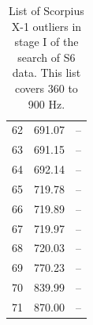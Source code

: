 \begin{table}
\begin{center}
\begin{tabular}{r r l}
62 & 691.07 & -- \\
63 & 691.15 & -- \\
64 & 692.14 & -- \\
65 & 719.78 & -- \\
66 & 719.89 & -- \\
67 & 719.97 & -- \\
68 & 720.03 & -- \\
69 & 770.23 & -- \\
70 & 839.99 & -- \\
71 & 870.00 & -- \\
\end{tabular}
\caption{List of Scorpius X-1 outliers in stage I of the search of S6 data. This list covers 360 to 900 Hz.}
\label{ScoX1S6outlierTableHF1}
\end{center}
\end{table}

